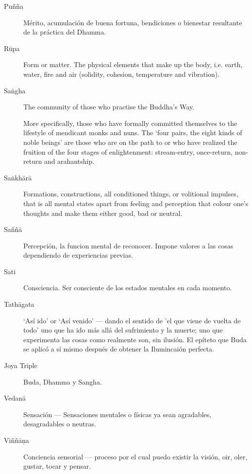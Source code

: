 \begin{description}
\item[Puñña] Mérito, acumulación de buena fortuna, bendiciones o bienestar resultante de la práctica del Dhamma.

\item[Rūpa] Form or matter. The physical elements that make up the body,
  i.e. earth, water, fire and air (solidity, cohesion, temperature and
  vibration).

\item[Saṅgha] The community of those who practise the Buddha’s Way.

  More specifically, those who have formally committed themselves to the
lifestyle of mendicant monks and nuns. The `four pairs, the eight kinds of
noble beings' are those who are on the path to or who have realized the
fruition of the four stages of enlightenment: stream-entry, once-return,
non-return and arahantship.

\item[Saṅkhārā] Formations, constructions, all conditioned things, or volitional
  impulses, that is all mental states apart from feeling and perception
  that colour one’s thoughts and make them either good, bad or neutral.

\item[Saññā] Percepción, la funcion mental de reconocer. Impone valores a las cosas dependiendo de experiencias previas.

\item[Sati] Consciencia. Ser consciente de los estados mentales en cada momento.

\item[Tathāgata] ‘Así ido’ or ‘Así venido’ --- dando el sentido de 'el que viene de vuelta de todo' uno que ha ido más allá del sufrimiento y la muerte; uno que experimenta las cosas como realmente son, sin ilusión. El epíteto que Buda se aplicó a sí mismo después de obtener la Ilumincaión perfecta.

\item[Joya Triple] Buda, Dhamma y Sangha.

\item[Vedanā] Sensación --- Sensaciones mentales o físicas ya sean agradables, desagradables o neutras.

\item[Viññāṇa] Conciencia sensorial --- proceso por el cual puedo existir la visión, oir, oler, gustar, tocar y pensar.

\end{description}

